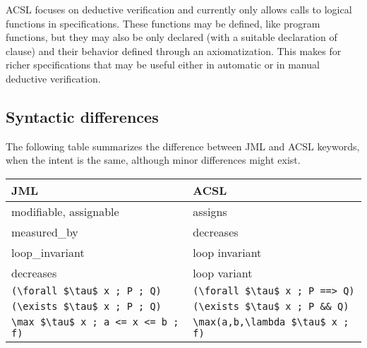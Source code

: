ACSL focuses on deductive verification and currently only allows calls to logical functions in
specifications. These functions may be defined, like program functions, but
they may also be only declared (with a suitable declaration of \reads
clause) and their behavior defined through an axiomatization.
This makes for richer specifications that may be useful either in
automatic or in manual deductive verification.


\subsection{Syntactic differences}

The following table summarizes the difference between JML and ACSL keywords, when the intent is the same, although minor differences
might exist.
\begin{center}
\begin{tabular}{|l|l|}
\hline
  JML                  & ACSL \\ \hline
  modifiable, assignable           & assigns \\
  measured\_by         & decreases \\
  loop\_invariant      & loop invariant \\
  decreases            & loop variant \\
  \lstinline|(\forall $\tau$ x ; P ; Q)| &
       \lstinline|(\forall $\tau$ x ; P ==> Q)| \\
  \lstinline|(\exists $\tau$ x ; P ; Q)| &
        \lstinline|(\exists $\tau$ x ; P && Q)| \\
  \lstinline|\max $\tau$ x ; a <= x <= b ; f)| &
        \lstinline|\max(a,b,\lambda $\tau$ x ; f)| \\
  \hline
\end{tabular}
\end{center}

